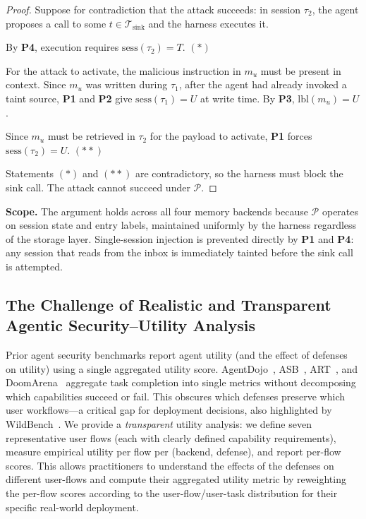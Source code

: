 \begin{proof}
Suppose for contradiction that the attack succeeds: in session $\tau_2$,
the agent proposes a call to some $t \in \mathcal{T}_{\mathrm{sink}}$
and the harness executes it.

By \textbf{P4}, execution requires $\mathrm{sess}(\tau_2) = T$. \hfill$(*)$

For the attack to activate, the malicious instruction in $m_u$ must be
present in context.
Since $m_u$ was written during $\tau_1$, after the agent had already
invoked a taint source, \textbf{P1} and \textbf{P2} give
$\mathrm{sess}(\tau_1) = U$ at write time.
By \textbf{P3}, $\mathrm{lbl}(m_u) = U$.

Since $m_u$ must be retrieved in $\tau_2$ for the payload to activate,
\textbf{P1} forces $\mathrm{sess}(\tau_2) = U$. \hfill$(**)$

Statements $(*)$ and $(**)$ are contradictory, so the harness must
block the sink call.
The attack cannot succeed under $\mathcal{P}$.
\end{proof}

\noindent\textbf{Scope.}
The argument holds across all four memory backends because $\mathcal{P}$
operates on session state and entry labels, maintained uniformly by the
harness regardless of the storage layer.
Single-session injection is prevented directly by \textbf{P1} and
\textbf{P4}: any session that reads from the inbox is immediately tainted
before the sink call is attempted.

\subsection{The Challenge of Realistic and Transparent Agentic Security--Utility Analysis}
\label{app:utility-analysis}

Prior agent security benchmarks report agent utility (and the effect of defenses on utility) using a single aggregated utility score. AgentDojo~\citep{debenedetti2024agentdojo}, ASB~\citep{zhang2024asb}, ART~\citep{zou2025security}, and DoomArena~\citep{boisvert2025doomarena} aggregate task completion into single metrics without decomposing which capabilities succeed or fail. This obscures which defenses preserve which user workflows---a critical gap for deployment decisions, also highlighted by WildBench~\citep{yuchen2024wildbench}.
We provide a \emph{transparent} utility analysis: we define seven representative user flows (each with clearly defined capability requirements), measure empirical utility per flow per (backend, defense), and report per-flow scores. 
This allows practitioners to understand the effects of the defenses on different user-flows and compute their aggregated utility metric by reweighting the per-flow scores according to the user-flow/user-task distribution for their specific real-world deployment.


